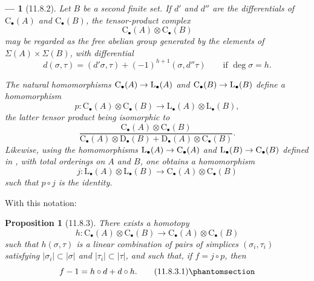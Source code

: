 \documentclass[oneside]{amsart}
\theoremstyle{ega-env-style}
\newtheorem*{env}{---}
\theoremstyle{ega-thm-env-style}
\newtheorem*{proposition}{Proposition}
\theoremstyle{ega-defn-env-style}
\renewcommand{\to}{\mathchoice{\longrightarrow}{\rightarrow}{\rightarrow}{\rightarrow}}
\newcommand{\oldpage}[2][]{{\marginnote{\normalfont{\textbf{#1}~|~#2}}}\ignorespaces}
\let\EGAOriginalLabel\label
\renewcommand{\label}[1]{\phantomsection\EGAOriginalLabel{#1}}
\begin{document}
\begin{env}[11.8.2]
\label{0.11.8.2}
Let $B$ be a second finite set.
If $d'$ and $d''$ are the differentials of
$\mathrm{C}_\bullet(A)$ and $\mathrm{C}_\bullet(B)$, the tensor-product
complex
\[
  \mathrm{C}_\bullet(A)\otimes\mathrm{C}_\bullet(B)
\]
may be regarded as the free abelian group generated by the elements of
$\Sigma(A)\times\Sigma(B)$, with differential
\[
  d(\sigma,\tau)
  =
  (d'\sigma,\tau)+(-1)^{h+1}(\sigma,d''\tau)
  \qquad\text{if }\deg\sigma=h.
\]

The natural homomorphisms
$\mathrm{C}_\bullet(A)\to\mathrm{L}_\bullet(A)$ and
$\mathrm{C}_\bullet(B)\to\mathrm{L}_\bullet(B)$ define a homomorphism
\[
  p:
  \mathrm{C}_\bullet(A)\otimes\mathrm{C}_\bullet(B)
  \longrightarrow
  \mathrm{L}_\bullet(A)\otimes\mathrm{L}_\bullet(B),
\]
the latter tensor product being isomorphic to
\[
  \frac{\mathrm{C}_\bullet(A)\otimes\mathrm{C}_\bullet(B)}
  {\mathrm{C}_\bullet(A)\otimes\mathrm{D}_\bullet(B)
   +\mathrm{D}_\bullet(A)\otimes\mathrm{C}_\bullet(B)}.
\]
Likewise, using the homomorphisms
$\mathrm{L}_\bullet(A)\to\mathrm{C}_\bullet(A)$ and
$\mathrm{L}_\bullet(B)\to\mathrm{C}_\bullet(B)$ defined in
, with total orderings on $A$ and $B$, one obtains a
homomorphism
\[
  j:
  \mathrm{L}_\bullet(A)\otimes\mathrm{L}_\bullet(B)
  \longrightarrow
  \mathrm{C}_\bullet(A)\otimes\mathrm{C}_\bullet(B)
\]
such that $p\circ j$ is the identity.
\end{env}

\oldpage[0\textsubscript{III}]{44}
With this notation:
\begin{proposition}[11.8.3]
\label{0.11.8.3}
There exists a homotopy
\[
  h:
  \mathrm{C}_\bullet(A)\otimes\mathrm{C}_\bullet(B)
  \longrightarrow
  \mathrm{C}_\bullet(A)\otimes\mathrm{C}_\bullet(B)
\]
such that $h(\sigma,\tau)$ is a linear combination of pairs of simplices
$(\sigma_i,\tau_i)$ satisfying
$|\sigma_i|\subset|\sigma|$ and $|\tau_i|\subset|\tau|$, and such that,
if $f=j\circ p$, then
\[
  f-1=h\circ d+d\circ h.
  \tag{11.8.3.1}\label{0.11.8.3.1}
\]
\end{proposition}
\end{document}
